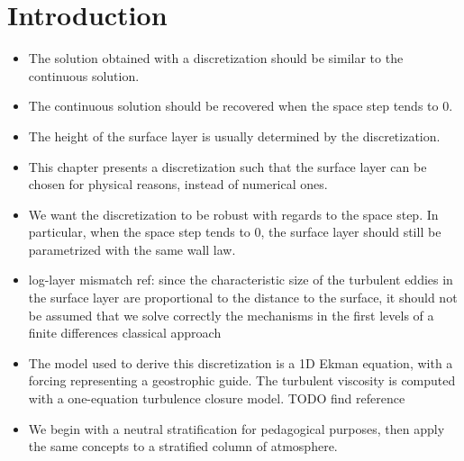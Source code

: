 \section{Introduction}
\begin{itemize}
\item The solution obtained with a discretization
	should be similar to the continuous solution.
\item The continuous solution should be recovered when
	the space step tends to 0.
\item The height of the surface layer
	is usually determined by the discretization.
\item This chapter presents a discretization such that
	the surface layer can be chosen for physical reasons,
		instead of numerical ones.
\item We want the discretization to be robust with regards to
	the space step. In particular, when the space step
		tends to 0, the surface layer should still
		be parametrized with the same wall law.
\item {\color{red} log-layer mismatch ref: since the characteristic
	size of the turbulent eddies in the surface layer are
		proportional to the distance to the surface,
		it should not be assumed that we solve
		correctly the mechanisms in the first levels
		of a finite differences classical approach}
\item The model used to derive this discretization is a 1D Ekman
	equation, with a forcing representing a geostrophic guide.
		The turbulent viscosity is computed with a
		one-equation turbulence closure model.
		{\color{red} TODO find reference}
\item We begin with a neutral stratification for pedagogical purposes,
	then apply the same concepts to a stratified column of
		atmosphere.
\end{itemize}
